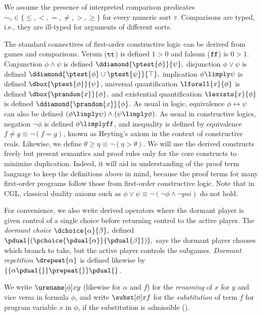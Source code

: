 \documentclass[12pt]{cmuthesis}
\theoremstyle{definition}
\theoremstyle{remark}
\newcommand{\rref}[2][]{\prettyref{#2}}
\newcommand{\lequiv}{\leftrightarrow}
\newcommand{\CGL}{\textsf{CGL}\xspace}
\begin{document}
We assume the presence of interpreted comparison predicates $\sim_\tau \in \{\leq, <, =, \neq, >, \geq\}$ for every numeric sort $\tau$.
Comparisons are typed, i.e., they are ill-typed for arguments of different sorts.

The standard connectives of first-order constructive logic can be derived from games and comparisons.
Verum ($\texttt{tt}$) is defined $1 > 0$ and falsum ($\texttt{ff}$) is $0 > 1$.
Conjunction $\phi \land \psi$ is defined $\ddiamond{\ptest{\phi}}{\psi},$ 
disjunction $\phi \lor  \psi$ is defined $\ddiamond{\ptest{\phi} \cup \ptest{\psi}}{\top},$
implication $\phi \limply \psi$ is defined $\dbox{\ptest{\phi}}{\psi}$,
universal quantification $\lforall{x}{\phi}$ is defined $\dbox{\prandom{x}}{\phi},$ and 
existential quantification $\lexists{x}{\phi}$ is defined $\ddiamond{\prandom{x}}{\phi}$.
As usual in logic, equivalence $\phi \lequiv \psi$ can also be defined $(\phi \limply \psi) \land (\psi \limply \phi)$.
As usual in constructive logics, negation $\neg \phi$ is defined $\phi \limply \bff$, and inequality is defined by equivalence $f \neq g \equiv \neg(f = g)$, known as Heyting's axiom in the context of constructive reals.
Likewise, we define $\theta \geq \eta \equiv \neg(\eta > \theta)$.
We will use the derived constructs freely but present semantics and proof rules only for the core constructs to minimize duplication.
Indeed, it will aid in understanding of the proof term language to keep the definitions above in mind, because the proof terms for many first-order programs follow those from first-order constructive logic.
Note that in \CGL, classical duality axioms such as $\phi \lor \psi \equiv \neg(\neg \phi \land \neg psi)$ do not hold.

For convenience, we also write derived operators where the dormant player is given control of a single choice before returning control to the active player.
The \emph{dormant choice} $\dchoice{\alpha}{\beta},$ defined $\pdual{({\pchoice{\pdual{\alpha}}{\pdual{\beta}}})},$ says the dormant player chooses which branch to take, but the active player controls the subgames.
\emph{Dormant repetition} $\drepeat{\alpha}$ is defined likewise by $\{\{\alpha\pdual{{}}\} \prepeat{{}}\} \pdual{{}}$.

We write $\eren{\phi}{x}{y}$ (likewise for $\alpha$ and $f$) for the \emph{renaming} of $x$ for $y$ and vice versa in formula $\phi$, and write $\tsub{\phi}{x}{f}$ for the \emph{substitution} of term $f$ for program variable $x$ in $\phi$, if the substitution is admissible (\rref{def:lem-admit}).
\end{document}
